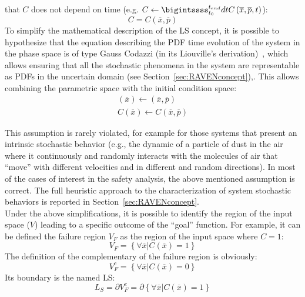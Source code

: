 that $C$ does not depend on time (e.g. $C\leftarrow 
\bigintssss_{t_{0}}^{t_{end}}dtC\left(  \overline{x},\overline{p},t \right )$):
\begin{equation}
  \label{eq:goalFunction}
  C = C\left (\overline{x},\overline{p}\right ) 
\end{equation}
To simplify the mathematical description of the LS concept, it is 
possible to hypothesize that the 
equation describing the PDF time evolution of the system in the phase 
space is of type Gauss 
Codazzi (in its Liouville’s derivation)~\cite{MathFrameworkMC2013}, which allows ensuring that all the 
stochastic phenomena in 
the system are representable as PDFs in the uncertain domain 
(see Section~\ref{sec:RAVENconcept}),. This allows combining the 
parametric space with the initial condition space:
\begin{equation}
  \label{eq:goalFunctionCodazzi}
  \begin{matrix} 
  \left ( \overline{x} \right ) \leftarrow \left ( \overline{x},\overline{p} \right ) \\
  C\left ( \overline{x} \right ) \leftarrow C\left ( \overline{x},\overline{p} \right )
  \end{matrix}
\end{equation}

This assumption is rarely violated, for example for those systems that 
present an intrinsic 
stochastic behavior (e.g., the dynamic of a particle of dust in the air 
where it continuously and 
randomly interacts with the molecules of air that ``move'' with different velocities and in different 
and random directions). In most of the cases of interest in the safety analysis, the above 
mentioned assumption is correct. The full heuristic approach to the characterization of system stochastic behaviors is reported in Section~\ref{sec:RAVENconcept}.
\\Under the above simplifications, it is possible to identify the region of the input space ($V$) 
leading to a specific outcome of the ``goal'' function. For example, it can be defined 
the failure region $V_{F}$ as the region of the input space where $C=1$:
\begin{equation}
 \label{eq:failureRegion}
V_{F}=\left \{ \forall \overline{x} | C\left ( \overline{x} \right ) = 1 \right \}
\end{equation}
The definition of the complementary of the failure region is obviously:
\begin{equation}
V_{F}^{c}=\left \{ \forall \overline{x} | C\left ( \overline{x} \right ) = 0 \right \}
\end{equation}
Its boundary is the named LS:
\begin{equation}
L_{S}= \partial V_{F}^{c}= \partial      \left \{ \forall \overline{x} | C\left ( \overline{x} \right ) = 1 \right \}
\end{equation}

